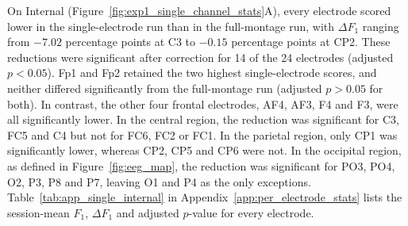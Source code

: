 On Internal (Figure~\ref{fig:exp1_single_channel_stats}A), every electrode scored lower in the single-electrode run than in the full-montage run, with $\Delta F_1$ ranging from $-7.02$ percentage points at C3 to $-0.15$ percentage points at CP2. These reductions were significant after correction for 14 of the 24 electrodes (adjusted $p < 0.05$). Fp1 and Fp2 retained the two highest single-electrode scores, and neither differed significantly from the full-montage run (adjusted $p > 0.05$ for both). In contrast, the other four frontal electrodes, AF4, AF3, F4 and F3, were all significantly lower. In the central region, the reduction was significant for C3, FC5 and C4 but not for FC6, FC2 or FC1. In the parietal region, only CP1 was significantly lower, whereas CP2, CP5 and CP6 were not. In the occipital region, as defined in Figure~\ref{fig:eeg_map}, the reduction was significant for PO3, PO4, O2, P3, P8 and P7, leaving O1 and P4 as the only exceptions. Table~\ref{tab:app_single_internal} in Appendix~\ref{app:per_electrode_stats} lists the session-mean $F_1$, $\Delta F_1$ and adjusted $p$-value for every electrode.
